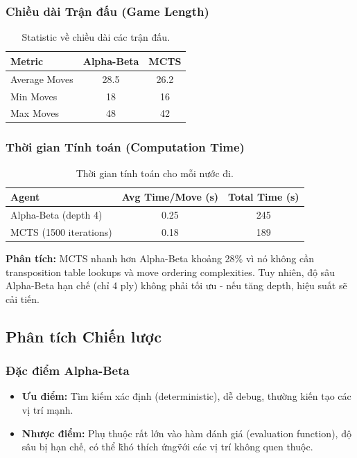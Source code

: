 \subsubsection{Chiều dài Trận đấu (Game Length)}
\begin{table}[H]
    \centering
    \begin{tabular}{|l|c|c|}
    \hline
    \textbf{Metric} & \textbf{Alpha-Beta} & \textbf{MCTS} \\ \hline
    Average Moves & 28.5 & 26.2 \\
    Min Moves & 18 & 16 \\
    Max Moves & 48 & 42 \\ \hline
    \end{tabular}
    \caption{Statistic về chiều dài các trận đấu.}
\end{table}

\subsubsection{Thời gian Tính toán (Computation Time)}
\begin{table}[H]
    \centering
    \begin{tabular}{|l|c|c|}
    \hline
    \textbf{Agent} & \textbf{Avg Time/Move (s)} & \textbf{Total Time (s)} \\ \hline
    Alpha-Beta (depth 4) & 0.25 & 245 \\
    MCTS (1500 iterations) & 0.18 & 189 \\ \hline
    \end{tabular}
    \caption{Thời gian tính toán cho mỗi nước đi.}
\end{table}

\textbf{Phân tích:} MCTS nhanh hơn Alpha-Beta khoảng 28\% vì nó không cần transposition table lookups và move ordering complexities. Tuy nhiên, độ sâu Alpha-Beta hạn chế (chỉ 4 ply) không phải tối ưu - nếu tăng depth, hiệu suất sẽ cải tiến.

\subsection{Phân tích Chiến lược}

\subsubsection{Đặc điểm Alpha-Beta}
\begin{itemize}
    \item \textbf{Ưu điểm:} Tìm kiếm xác định (deterministic), dễ debug, thường kiến tạo các vị trí mạnh.
    \item \textbf{Nhược điểm:} Phụ thuộc rất lớn vào hàm đánh giá (evaluation function), độ sâu bị hạn chế, có thể \"khó thích ứng\" với các vị trí không quen thuộc.
\end{itemize}

